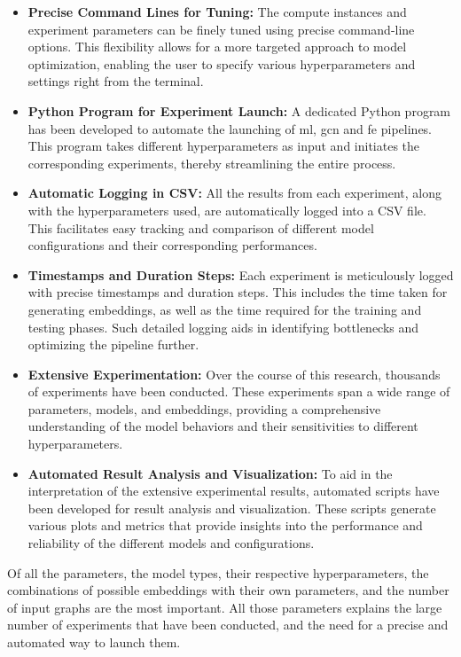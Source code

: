 \begin{itemize}
    \item \textbf{Precise Command Lines for Tuning:} The compute instances and experiment parameters can be finely tuned using precise command-line options. This flexibility allows for a more targeted approach to model optimization, enabling the user to specify various hyperparameters and settings right from the terminal.
    
    \item \textbf{Python Program for Experiment Launch:} A dedicated Python program has been developed to automate the launching of \acrshort{ml}, \acrshort{gcn} and \acrshort{fe} pipelines. This program takes different hyperparameters as input and initiates the corresponding experiments, thereby streamlining the entire process.
    
    \item \textbf{Automatic Logging in CSV:} All the results from each experiment, along with the hyperparameters used, are automatically logged into a CSV file. This facilitates easy tracking and comparison of different model configurations and their corresponding performances.
    
    \item \textbf{Timestamps and Duration Steps:} Each experiment is meticulously logged with precise timestamps and duration steps. This includes the time taken for generating embeddings, as well as the time required for the training and testing phases. Such detailed logging aids in identifying bottlenecks and optimizing the pipeline further.
    
    \item \textbf{Extensive Experimentation:} Over the course of this research, thousands of experiments have been conducted. These experiments span a wide range of parameters, models, and embeddings, providing a comprehensive understanding of the model behaviors and their sensitivities to different hyperparameters.
    
    \item \textbf{Automated Result Analysis and Visualization:} To aid in the interpretation of the extensive experimental results, automated scripts have been developed for result analysis and visualization. These scripts generate various plots and metrics that provide insights into the performance and reliability of the different models and configurations.
\end{itemize}

Of all the parameters, the model types, their respective hyperparameters, the combinations of possible embeddings with their own parameters, and the number of input graphs are the most important. All those parameters explains the large number of experiments that have been conducted, and the need for a precise and automated way to launch them.

